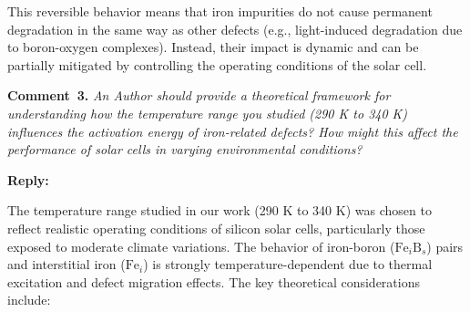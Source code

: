 \documentclass[a4paper,fleqn]{cas-sc}
\begin{document}
This reversible behavior means that iron impurities do not cause permanent degradation in the same way as other defects (e.g., light-induced degradation due to boron-oxygen complexes). Instead, their impact is dynamic and can be partially mitigated by controlling the operating conditions of the solar cell.


\vspace{1cm}
\noindent
\textcolor[rgb]{0.00,0.50,1.00}{\textbf{Comment~3.}}
\emph{An Author should provide a theoretical framework for understanding how the temperature range you studied (290 K to 340 K) influences the activation energy of iron-related defects? How might this affect the performance of solar cells in varying environmental conditions?}

\noindent
\textcolor[rgb]{0.51,0.00,0.00}{\textbf{Reply:}}

The temperature range studied in our work (290 K to 340 K) was chosen to reflect realistic operating conditions of silicon solar cells, particularly those exposed to moderate climate variations. The behavior of iron-boron ($\mathrm{Fe}_i\mathrm{B}_s$) pairs and interstitial iron ($\mathrm{Fe}_i$) is strongly temperature-dependent due to thermal excitation and defect migration effects. The key theoretical considerations include:
\end{document}
